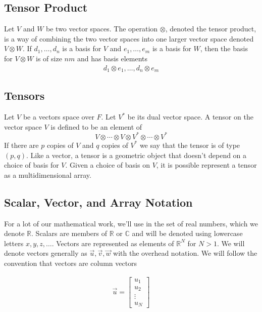 \documentclass[book.tex]{subfiles}
\begin{document}
\subsection{Tensor Product}
Let $V$ and $W$ be two vector spaces. The operation $\otimes$, denoted the tensor product, is a way of combining the two vector spaces into one larger vector space denoted $V \otimes W$. If $d_1,\dotsc, d_n$ is a basis for $V$ and $e_1,\dotsc,e_m$ is a basis for $W$, then the basis for $V \otimes W$ is of size $nm$ and has basis elements 
\begin{align}
    d_1 \otimes e_1, \dotsc, d_n \otimes e_m 
\end{align}

\subsection{Tensors}
Let $V$ be a vectors space over $F$. Let $V^*$ be its dual vector space. A tensor on the vector space $V$ is defined to be an element of 
\begin{equation}
    V \otimes \cdots \otimes V \otimes V^* \otimes \cdots \otimes V^*
\end{equation}
If there are $p$ copies of $V$ and $q$ copies of $V^*$ we say that the tensor is of type $(p, q)$. Like a vector, a tensor is a geometric object that doesn't depend on a choice of basis for $V$. Given a choice of basis on $V$, it is possible represent a tensor as a multidimensional array.

\subsection{Scalar, Vector, and Array Notation}

For a lot of our mathematical work, we'll use in the set of real numbers, which we denote $\mathbb{R}$. Scalars are members of $\mathbb{R}$ or $\mathbb{C}$ and will be denoted using lowercase letters $x, y, z, \dotsc$. Vectors are represented as elements of $\mathbb{R}^N$ for $N > 1$. We will denote vectors generally as $\vec{u}, \vec{v}, \vec{w}$ with the overhead notation. We will follow the convention that vectors are column vectors

\begin{align}
    \vec{u} = \begin{bmatrix}
           u_{1} \\
           u_{2} \\
           \vdots \\
           u_{N}
         \end{bmatrix}
\end{align}
\end{document}
